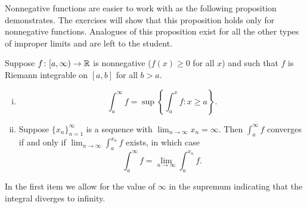 Nonnegative functions are easier to work with
as the following proposition demonstrates.
The exercises will show that this proposition
holds only for nonnegative functions.
Analogues of this proposition
exist for all the other types of improper limits and are left to the
student.

\begin{prop} \label{impropriemann:possimp}
Suppose $f \colon [a,\infty) \to {\mathbb{R}}$ is nonnegative ($f(x)
\geq 0$ for all $x$) and such that
$f$ is Riemann integrable on $[a,b]$ for all $b > a$.
\begin{enumerate}[(i)]
\item 
\begin{equation*}
\int_a^\infty f = \sup \left\{ \int_a^x f : x \geq a \right\} .
\end{equation*}
\item
Suppose $\{ x_n \}_{n=1}^\infty$
is a sequence with $\lim_{n\to\infty} x_n = \infty$.  Then
$\int_a^\infty f$ converges if and only if $\lim_{n\to\infty} \int_a^{x_n} f$ exists, in
which case
\begin{equation*}
\int_a^\infty f = \lim_{n\to\infty} \int_a^{x_n} f .
\end{equation*}
\end{enumerate}
\end{prop}

In the first item we allow for the value of $\infty$ in the
supremum indicating that the integral diverges to infinity.

